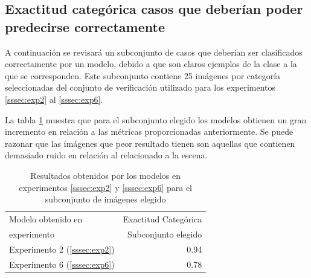 \subsection{Exactitud categórica casos que deberían poder predecirse correctamente}
A continuación se revisará un subconjunto de casos que deberían ser clasificados correctamente por un modelo, debido a que son claros ejemplos de la clase a la que se corresponden. Este subconjunto contiene 25 imágenes por categoría seleccionadas del conjunto de verificación utilizado para los experimentos \ref{sssec:exp2} al \ref{sssec:exp6}. 

La tabla \ref{conclusiones:subset:results} muestra que para el subconjunto elegido los modelos obtienen un gran incremento en relación a las métricas proporcionadas anteriormente. Se puede razonar que las imágenes que peor resultado tienen son aquellas que contienen demasiado ruido en relación al relacionado a la escena.

\begin{table}[h!]
	\centering
	\begin{tabular}{| l | r |}
		\toprule
		Modelo obtenido en & Exactitud Categórica \\
		experimento & Subconjunto elegido \\
		\midrule
		Experimento 2 (\ref{sssec:exp2}) & 0.94 \\
		\midrule
		Experimento 6 (\ref{sssec:exp6}) & 0.78 \\
		\bottomrule
	\end{tabular}\caption{Resultados obtenidos por los modelos en experimentos \ref{sssec:exp2} y \ref{sssec:exp6} para el subconjunto de imágenes elegido}
	\label{conclusiones:subset:results}
\end{table}

